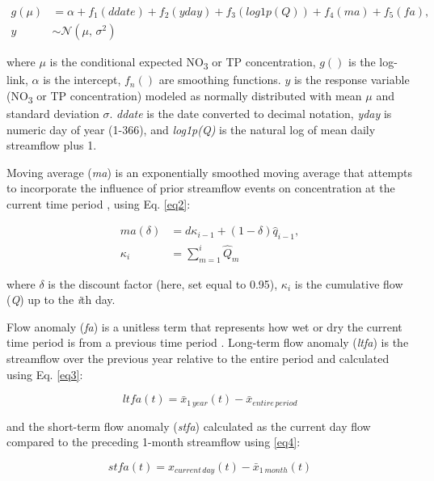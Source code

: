 \documentclass[sn-basic,referee,lineno,pdflatex]{sn-jnl}
\begin{document}
\begin{align}
g(\mu) &= \alpha + f_1(ddate) + f_2(yday) + f_3(log1p(Q)) + f_4(ma) + f_5(fa), \nonumber \\
y &\sim \mathcal{N}(\mu,\,\sigma^{2})
\label{eq1}
\end{align}

where \(\mu\) is the conditional expected NO\textsubscript{3} or TP
concentration, \(g()\) is the log-link, \(\alpha\) is the intercept,
\(f_n()\) are smoothing functions. \(y\) is the response variable
(NO\textsubscript{3} or TP concentration) modeled as normally
distributed with mean \(\mu\) and standard deviation \(\sigma\).
\emph{ddate} is the date converted to decimal notation, \emph{yday} is
numeric day of year (1-366), and \emph{log1p(Q)} is the natural log of
mean daily streamflow plus 1.

Moving average (\emph{ma}) is an exponentially smoothed moving average
that attempts to incorporate the influence of prior streamflow events on
concentration at the current time period
\citep{wangLoadEstimationUncertainties2011, kuhnertQuantifyingTotalSuspended2012, zhang_improving_2017},
using Eq. \ref{eq2}:

\begin{align}
ma(\delta) &= d{\kappa_{i-1}}+(1-\delta)\hat{q}_{i-1}, \nonumber \\
\kappa_{i} &=\sum_{m=1}^{i}\hat{Q}_m
\label{eq2}
\end{align}

where \(\delta\) is the discount factor (here, set equal to 0.95),
\(\kappa_i\) is the cumulative flow (\emph{Q}) up to the \emph{i}th day.

Flow anomaly (\emph{fa}) is a unitless term that represents how wet or
dry the current time period is from a previous time period
\citep{vecchiaTrendsConcentrationsUse2009, zhang_improving_2017}.
Long-term flow anomaly (\emph{ltfa}) is the streamflow over the previous
year relative to the entire period \citep{zhang_improving_2017} and
calculated using Eq. \ref{eq3}:

\begin{equation}
ltfa(t) = \bar{x}_{1\,year}(t) - \bar{x}_{entire\,period}
\label{eq3}
\end{equation}

and the short-term flow anomaly (\emph{stfa}) calculated as the current
day flow compared to the preceding 1-month streamflow using \ref{eq4}:

\begin{equation}
stfa(t) = x_{current\,day}(t) - \bar{x}_{1\,month}(t)
\label{eq4}
\end{equation}
\end{document}
